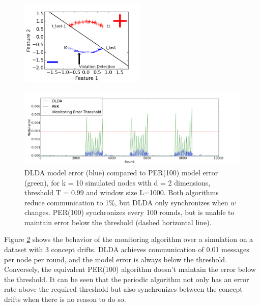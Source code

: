\documentclass{sig-alternate-05-2015}
\begin{document}
\begin{figure}[ht]
	\centering
	\includegraphics[width=60mm]{EarlyDetection.png}
	\caption{ }
	\label{EarlyDetection}
\end{figure}

\begin{figure}[ht]
	\centering
	\includegraphics[width=\textwidth]{PER/PERvsDLDAoverTime.png}
	\caption{ DLDA model error (blue) compared to PER(100) model error (green),
	for k = 10 simulated nodes with d = 2 dimensions, threshold T = 0.99 and
	window size L=1000. Both algorithms reduce communication to 1\%, but DLDA
	only synchronizes when $w$ changes. PER(100) synchronizes every 100 rounds,
	but is unable to maintain error below the threshold (dashed horizontal line).}
	\label{PERvsDLDAoverTime}
\end{figure}
	
Figure \ref{PERvsDLDAoverTime} shows the behavior of the monitoring
algorithm over a simulation on a dataset with 3 concept drifts.
DLDA achieves communication of 0.01 messages per node per round, and
the model error is always below the threshold.
Conversely, the equivalent PER(100) algorithm doesn't maintain the
error below the threshold.
It can be seen that the periodic algorithm
not only has an error rate above the required threshold but also
synchronizes between the concept drifts when there is no reason to do so.
\end{document}
